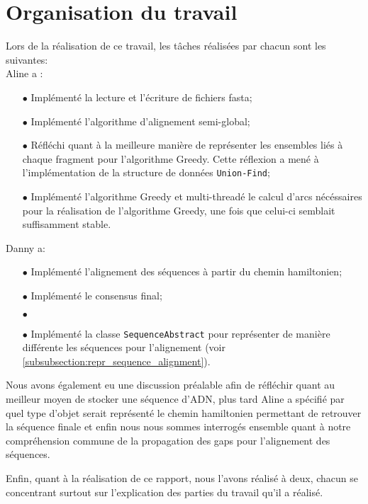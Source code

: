 \section{Organisation du travail}

Lors de la réalisation de ce travail, les tâches réalisées par chacun sont les suivantes:\\
Aline a :
\begin{itemize}
	\item[$\bullet$]Implémenté la lecture et l'écriture de fichiers fasta;
	\item[$\bullet$]Implémenté l'algorithme d'alignement semi-global;
	\item[$\bullet$]Réfléchi quant à la meilleure manière de représenter les ensembles liés à chaque fragment pour l'algorithme Greedy.
	 Cette réflexion a mené à l'implémentation de la structure de données \verb|Union-Find|;
	\item[$\bullet$]Implémenté l'algorithme Greedy et multi-threadé le calcul d'arcs nécéssaires pour la réalisation de l'algorithme Greedy, une fois que celui-ci semblait suffisamment stable.
\end{itemize}
$ $\\
Danny a:
\begin{itemize}
	\item[$\bullet$] Implémenté l'alignement des séquences à partir du chemin hamiltonien;
	\item[$\bullet$] Implémenté le consensus final;
	\item[$\bullet$] %
	\item[$\bullet$] Implémenté la classe \verb|SequenceAbstract| pour
		représenter de manière différente les séquences pour l'alignement
		(voir \ref{subsubsection:repr_sequence_alignment}).
\end{itemize}

Nous avons également eu une discussion préalable afin de réfléchir quant au meilleur moyen de stocker une séquence d'ADN, plus tard Aline a spécifié par quel type d'objet serait représenté le chemin hamiltonien permettant de retrouver la séquence finale et enfin nous nous sommes interrogés ensemble quant à notre compréhension commune de la propagation des gaps pour l'alignement des séquences.
\begin{comment}
De plus, Aline ayant également réfléchi à la manière d'obtenir la séquence finale à partir du chemin hamiltonien donné par l'algorithme greedy avant que Danny ne propose sa propre solution, elle a également exposé son point de vue quant à la réalisation de cette dernière étape. Le temps lui ayant manqué, son algorithme n'est pas totalement abouti et nous avons donc continué de travailler à partir de celui de Danny.
\end{comment}

Enfin, quant à la réalisation de ce rapport, nous l'avons réalisé à deux, chacun se concentrant surtout sur l'explication des parties du travail qu'il a réalisé.

